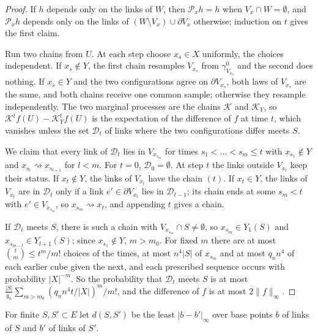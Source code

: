 \documentclass[aps,prd,twocolumn,superscriptaddress,nofootinbib,longbibliography,floatfix,amsmath,amssymb,10pt]{revtex4-2}
\theoremstyle{definition}
\theoremstyle{remark}
\begin{document}
\begin{proof}
If $h$ depends only on the links of $W$, then $\mathcal P_xh=h$ when $V_x\cap
W=\emptyset$, and $\mathcal P_xh$ depends only on the links of $(W\setminus
V_x)\cup\partial V_x$ otherwise; induction on $t$ gives the first claim.

Run two chains from $U$. At each step choose $x_s\in X$ uniformly, the
choices independent. If $x_s\notin Y$, the first chain resamples $V_{x_s}$
from $\gamma^0_{V_{x_s}}$ and the second does nothing. If $x_s\in Y$ and the
two configurations agree on $\partial V_{x_s}$, both laws of $V_{x_s}$ are
the same, and both chains receive one common sample; otherwise they
resample independently. The two marginal processes are the chains
$\mathcal K$ and $\mathcal K_Y$, so $\mathcal K^tf(U)-\mathcal K_Y^tf(U)$ is
the expectation of the difference of $f$ at time $t$, which vanishes unless
the set $\mathcal D_t$ of links where the two configurations differ meets $S$.

We claim that every link of $\mathcal D_t$ lies in $V_{x_{s_m}}$ for times
$s_1<\dots<s_m\le t$ with $x_{s_1}\notin Y$ and $x_{s_l}\rightsquigarrow
x_{s_{l+1}}$ for $l<m$. For $t=0$, $\mathcal D_0=\emptyset$. At step $t$
the links outside $V_{x_t}$ keep their status. If $x_t\notin Y$, the links
of $V_{x_t}$ have the chain $(t)$. If $x_t\in Y$, the links of $V_{x_t}$
are in $\mathcal D_t$ only if a link $e'\in\partial V_{x_t}$ lies in
$\mathcal D_{t-1}$; its chain ends at some $s_m<t$ with $e'\in V_{x_{s_m}}$,
so $x_{s_m}\rightsquigarrow x_t$, and appending $t$ gives a chain.

If $\mathcal D_t$ meets $S$, there is such a chain with $V_{x_{s_m}}\cap S\ne
\emptyset$, so $x_{s_m}\in Y_1(S)$ and $x_{s_{m-l}}\in Y_{l+1}(S)$; since
$x_{s_1}\notin Y$, $m>m_0$. For fixed $m$ there are at most $\binom tm\le
t^m/m!$ choices of the times, at most $n^4\lvert S\rvert$ of $x_{s_m}$ and at
most $q_nn^4$ of each earlier cube given the next, and each prescribed
sequence occurs with probability $\lvert X\rvert^{-m}$. So the probability
that $\mathcal D_t$ meets $S$ is at most $\frac{\lvert S\rvert}{q_n}\sum_{m>
m_0}(q_nn^4t/\lvert X\rvert)^m/m!$, and the difference of $f$ is at most
$2\lVert f\rVert_\infty$.
\end{proof}

For finite $S,S'\subset E$ let $d(S,S')$ be the least $\lvert b-b'\rvert_\infty$
over base points $b$ of links of $S$ and $b'$ of links of $S'$.
\end{document}
